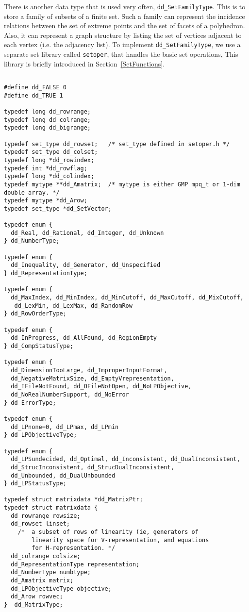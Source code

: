 \documentclass[11pt]{article}
\newcommand {\0} {{\bf 0}}
\begin{document}
There is another data type that is used very often, {\tt dd\_SetFamilyType}.
This is to store a family of subsets of a finite set.  Such a family
can represent the incidence relations between the set of extreme
points and the set of facets of a polyhedron.  Also, it can represent a
graph structure by listing the set of vertices adjacent to each vertex (i.e.
the adjacency list).   To implement  {\tt dd\_SetFamilyType},
we use  a separate set library called {\tt setoper}, that
handles the basic set operations,   This library is briefly introduced in
Section~\ref{SetFunctions}.


\begin{verbatim}

#define dd_FALSE 0
#define dd_TRUE 1

typedef long dd_rowrange;
typedef long dd_colrange;
typedef long dd_bigrange;

typedef set_type dd_rowset;   /* set_type defined in setoper.h */
typedef set_type dd_colset;
typedef long *dd_rowindex;   
typedef int *dd_rowflag;   
typedef long *dd_colindex;
typedef mytype **dd_Amatrix;  /* mytype is either GMP mpq_t or 1-dim double array. */
typedef mytype *dd_Arow;
typedef set_type *dd_SetVector;

typedef enum {
  dd_Real, dd_Rational, dd_Integer, dd_Unknown
} dd_NumberType;

typedef enum {
  dd_Inequality, dd_Generator, dd_Unspecified
} dd_RepresentationType;

typedef enum {
  dd_MaxIndex, dd_MinIndex, dd_MinCutoff, dd_MaxCutoff, dd_MixCutoff,
   dd_LexMin, dd_LexMax, dd_RandomRow
} dd_RowOrderType;

typedef enum {
  dd_InProgress, dd_AllFound, dd_RegionEmpty
} dd_CompStatusType;

typedef enum {
  dd_DimensionTooLarge, dd_ImproperInputFormat, 
  dd_NegativeMatrixSize, dd_EmptyVrepresentation,
  dd_IFileNotFound, dd_OFileNotOpen, dd_NoLPObjective, 
  dd_NoRealNumberSupport, dd_NoError
} dd_ErrorType;

typedef enum {
  dd_LPnone=0, dd_LPmax, dd_LPmin
} dd_LPObjectiveType;

typedef enum {
  dd_LPSundecided, dd_Optimal, dd_Inconsistent, dd_DualInconsistent,
  dd_StrucInconsistent, dd_StrucDualInconsistent,
  dd_Unbounded, dd_DualUnbounded
} dd_LPStatusType;

typedef struct matrixdata *dd_MatrixPtr;
typedef struct matrixdata {
  dd_rowrange rowsize;
  dd_rowset linset; 
    /*  a subset of rows of linearity (ie, generators of
        linearity space for V-representation, and equations
        for H-representation. */
  dd_colrange colsize;
  dd_RepresentationType representation;
  dd_NumberType numbtype;
  dd_Amatrix matrix;
  dd_LPObjectiveType objective;
  dd_Arow rowvec;
}  dd_MatrixType;


\end{verbatim}
\end{document}
